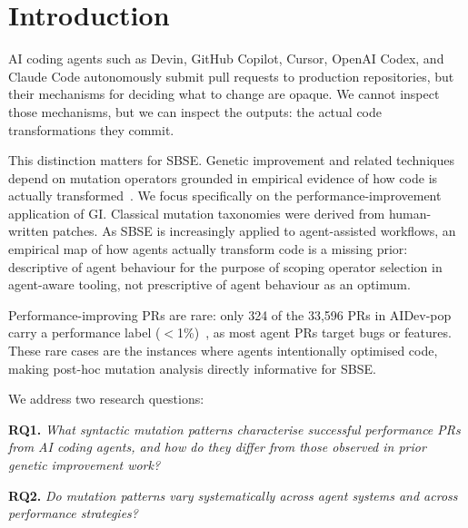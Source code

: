\documentclass[runningheads]{llncs}
\begin{document}

\section{Introduction}
\label{sec:intro}



AI coding agents such as Devin, GitHub Copilot, Cursor, OpenAI Codex, and
Claude Code autonomously submit pull requests to production repositories,
but their mechanisms for deciding what to change are opaque. We cannot
inspect those mechanisms, but we can inspect the outputs: the actual code
transformations they commit.

This distinction matters for SBSE.
Genetic improvement and related techniques depend on mutation operators
grounded in empirical evidence of how code is actually
transformed~\cite{harman2001sbse,jia2011mutation,petke2023program}.
We focus specifically on the performance-improvement application of GI.
Classical mutation taxonomies were derived from human-written patches.
As SBSE is increasingly applied to agent-assisted workflows, an empirical
map of how agents actually transform code is a missing prior:
descriptive of agent behaviour for the purpose of scoping operator
selection in agent-aware tooling, not prescriptive of agent behaviour as
an optimum.

Performance-improving PRs are rare: only 324 of the 33{,}596 PRs in
AIDev-pop~\cite{aidev} carry a performance label ($<$1\%)~\cite{opu2025agentic,peng2026agents},
as most agent PRs target bugs or features. These rare cases are the
instances where agents intentionally optimised code, making post-hoc
mutation analysis directly informative for SBSE.

We address two research questions:

\noindent\textbf{RQ1.} \emph{What syntactic mutation patterns characterise
successful performance PRs from AI coding agents, and how do they differ
from those observed in prior genetic improvement work?}

\noindent\textbf{RQ2.} \emph{Do mutation patterns vary systematically
across agent systems and across performance strategies?}
\end{document}
